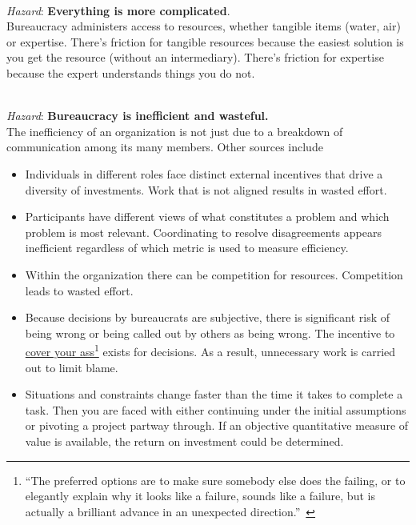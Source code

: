 \ \\
\begin{samepage}
\textit{Hazard}: \textbf{Everything is more complicated}. \\
Bureaucracy administers access to resources, whether tangible items (water, air) or expertise. There's friction for tangible resources because the easiest solution is you get the resource (without an intermediary). There's friction for expertise because the expert understands things you do not. 
\end{samepage}

\ \\
\textit{Hazard}: \textbf{Bureaucracy is inefficient and wasteful.}\\
The inefficiency of an organization is not just due to a breakdown of communication among its many members. Other sources include 
\begin{itemize}
    \item Individuals in different roles face distinct external incentives that drive a diversity of investments. Work that is not aligned results in wasted effort.
    \item Participants have different views of what constitutes a problem and which problem is most relevant. Coordinating to resolve disagreements appears inefficient regardless of which metric is used to measure efficiency.
    \item Within the organization there can be competition  for resources. Competition leads to wasted effort.
    \item Because decisions by bureaucrats are subjective, there is significant risk of being wrong or being called out by others as being wrong. The incentive to 
\href{https://en.wikipedia.org/wiki/Cover_your_ass}{cover your ass}\footnote{``The 
preferred options are to make sure somebody else does the failing, or to elegantly explain why it looks like a failure, sounds like a failure, but is actually a brilliant advance in an unexpected direction.''~\cite{1996_unknown}}
\iftoggle{WPinmargin}{\marginpar{$>$Wikipedia: Cover\\your ass}}{}
exists for decisions. As a result, unnecessary work is carried out to limit blame. 
\item Situations and constraints change faster than the time it takes to complete a task.  Then you are faced with either continuing under the initial assumptions or pivoting a project partway through. If an objective quantitative measure of value is available, the return on investment could be determined.
\end{itemize}


